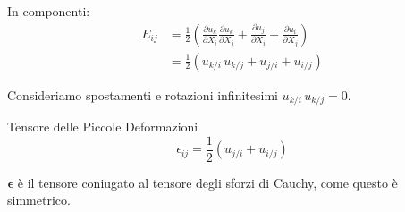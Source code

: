 In componenti:
\begin{align*}
E_{ij} &= \frac{1}{2} \left( \frac{\partial u_k}{\partial X_i} \frac{\partial u_k}{\partial X_j} + \frac{\partial u_j}{\partial X_i} + \frac{\partial u_i}{\partial X_j} \right) \\
&= \frac{1}{2} \left( u_{k/i} \, u_{k/j} + u_{j/i} + u_{i/j} \right) 
\end{align*}

Consideriamo spostamenti e rotazioni infinitesimi $ u_{k/i} \, u_{k/j}  = 0$.
\begin{definizioneBox}
Tensore delle Piccole Deformazioni
    \begin{equation*}
\epsilon_{ij} = \frac{1}{2} \left( u_{j/i} + u_{i/j} \right) 
\end{equation*}
\end{definizioneBox}

$\boldsymbol{\epsilon}$ è il tensore coniugato al tensore degli sforzi di Cauchy, come questo è simmetrico.







